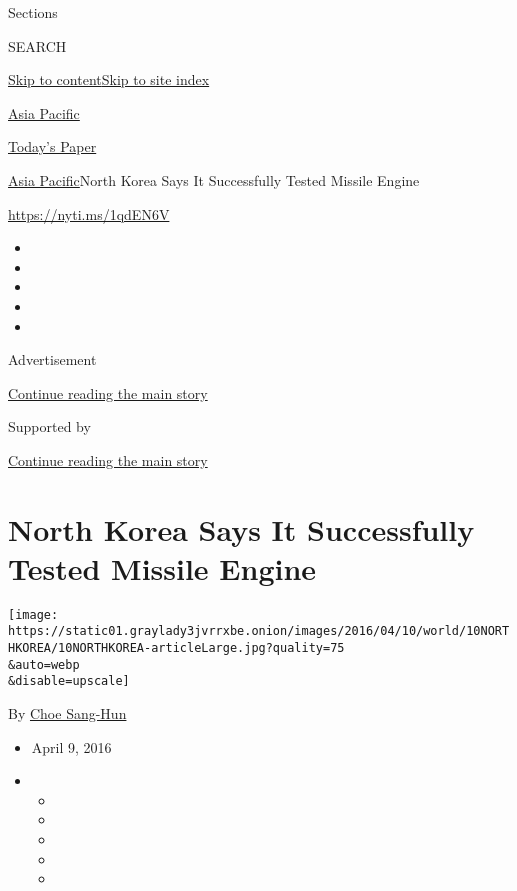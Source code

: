 Sections

SEARCH

\protect\hyperlink{site-content}{Skip to
content}\protect\hyperlink{site-index}{Skip to site index}

\href{https://www.nytimes3xbfgragh.onion/section/world/asia}{Asia
Pacific}

\href{https://myaccount.nytimes3xbfgragh.onion/auth/login?response_type=cookie\&client_id=vi}{}

\href{https://www.nytimes3xbfgragh.onion/section/todayspaper}{Today's
Paper}

\href{/section/world/asia}{Asia Pacific}\textbar{}North Korea Says It
Successfully Tested Missile Engine

\url{https://nyti.ms/1qdEN6V}

\begin{itemize}
\item
\item
\item
\item
\item
\end{itemize}

Advertisement

\protect\hyperlink{after-top}{Continue reading the main story}

Supported by

\protect\hyperlink{after-sponsor}{Continue reading the main story}

\hypertarget{north-korea-says-it-successfully-tested-missile-engine}{%
\section{North Korea Says It Successfully Tested Missile
Engine}\label{north-korea-says-it-successfully-tested-missile-engine}}

\texttt{[image: https://static01.graylady3jvrrxbe.onion/images/2016/04/10/world/10NORTHKOREA/10NORTHKOREA-articleLarge.jpg?quality=75\\\&auto=webp\\\&disable=upscale]}

By \href{http://www.nytimes3xbfgragh.onion/by/choe-sang-hun}{Choe
Sang-Hun}

\begin{itemize}
\item
  April 9, 2016
\item
  \begin{itemize}
  \item
  \item
  \item
  \item
  \item
  \end{itemize}
\end{itemize}

